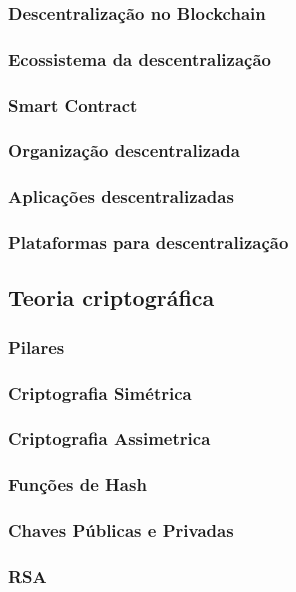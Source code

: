         \subsubsection{Descentralização no Blockchain}

        \subsubsection{Ecossistema da descentralização}

        \subsubsection{Smart Contract}

        \subsubsection{Organização descentralizada}

        \subsubsection{Aplicações descentralizadas}

        \subsubsection{Plataformas para descentralização}

\subsection{Teoria criptográfica}

    \subsubsection{Pilares}

    \subsubsection{Criptografia Simétrica}

    \subsubsection{Criptografia Assimetrica}
    
    \subsubsection{Funções de Hash}

    \subsubsection{Chaves Públicas e Privadas}

        \subsubsection{RSA}